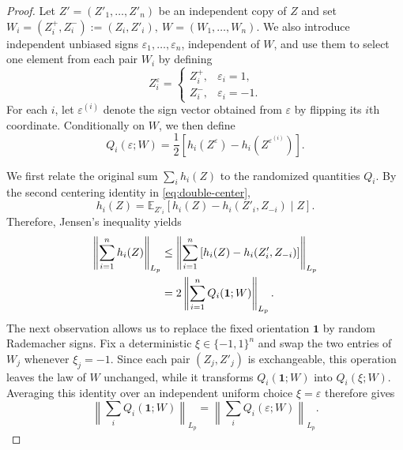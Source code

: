 \documentclass[10pt,a4paper]{amsart}
\newcommand{\E}{\mathbb{E}}
\newcommand{\norm}[1]{\left\lVert #1\right\rVert}
\begin{document}
\begin{proof}
Let $Z'=(Z'_1,\ldots,Z'_n)$ be an independent copy of $Z$ and set
\(
W_i=(Z_i^+,Z_i^-):=(Z_i,Z'_i), \ W=(W_1,\ldots, W_n).\)
We also introduce independent unbiased signs $\varepsilon_1,\ldots,\varepsilon_n$, independent of $W$, and use them to select one element from each pair $W_i$ by defining
\[
Z_i^\varepsilon=
\begin{cases}
Z_i^+,&\varepsilon_i=1,\\
Z_i^-,&\varepsilon_i=-1.
\end{cases}
\]
For each $i$, let $\varepsilon^{(i)}$ denote the sign vector obtained from $\varepsilon$ by flipping its $i$th coordinate. Conditionally on $W$, we then define
\[
Q_i(\varepsilon;W)
=
\frac12\left[
h_i(Z^\varepsilon)-h_i(Z^{\varepsilon^{(i)}})
\right].
\]

We first relate the original sum $\sum_i h_i(Z)$ to the randomized quantities $Q_i$. By the second centering identity in \eqref{eq:double-center},
\[ h_i(Z) = \E_{Z'_i} \left[ h_i(Z)-h_i(Z'_i,Z_{-i}) \mid Z \right]. \]
Therefore, Jensen's inequality yields
\begin{align}
\norm{\sum_{i=1}^nh_i(Z)}_{L_p} & \le \norm{ \sum_{i=1}^n \left[h_i(Z)-h_i(Z'_i,Z_{-i})\right]}_{L_p} \notag\\
& = 2\norm{\sum_{i=1}^nQ_i(\mathbf 1;W)}_{L_p}.
\label{eq:symmetrize}
\end{align}
The next observation allows us to replace the fixed orientation $\mathbf 1$ by random Rademacher signs. Fix a deterministic $\xi\in\{-1,1\}^n$ and swap the two entries of $W_j$ whenever $\xi_j=-1$. Since each pair $(Z_j,Z'_j)$ is exchangeable, this operation leaves the law of $W$ unchanged, while it transforms $Q_i(\mathbf1;W)$ into $Q_i(\xi;W)$. Averaging this identity over an independent uniform choice $\xi=\varepsilon$ therefore gives
\begin{equation}\label{eq:orientation}
\norm{\sum_iQ_i(\mathbf1;W)}_{L_p} = \norm{\sum_iQ_i(\varepsilon;W)}_{L_p}.
\end{equation}


\end{proof}
\end{document}
